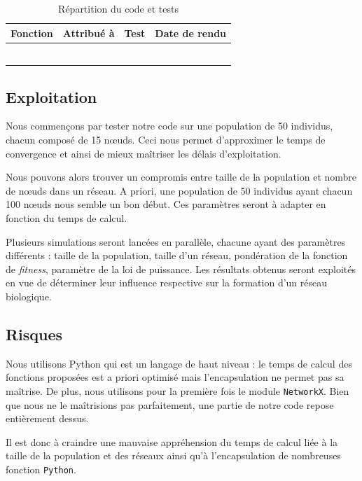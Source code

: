 \begin{center}
\begin{table}
\hspace{-2cm}
\begin{tabular}{|c|c|c|c|}
\hline Fonction & Attribué à & Test & Date de rendu \\
\hline
\hline \\
\hline \\
\hline \\
\hline \\
\hline \\
\hline \\
\end{tabular}
\caption{Répartition du code et tests}
\label{Tab}
\end{table}
\end{center}

\subsection{Exploitation}
Nous commençons par tester notre code sur une population de 50 individus, chacun composé de 15 nœuds. Ceci nous permet d'approximer le temps de convergence et ainsi de mieux ma\^itriser les délais d'exploitation.

Nous pouvons alors trouver un compromis entre taille de la population et nombre de nœuds dans un réseau. A priori, une population de 50 individus ayant chacun 100 nœuds nous semble un bon début. Ces paramètres seront à adapter en fonction du temps de calcul.

Plusieurs simulations seront lancées en parallèle, chacune ayant des paramètres différents : taille de la population, taille d'un réseau, pondération de la fonction de \textit{fitness}, paramètre de la loi de puissance. Les résultats obtenus seront exploités en vue de déterminer leur influence respective sur la formation d'un réseau biologique.

\subsection{Risques}
Nous utilisons Python qui est un langage de haut niveau : le temps de calcul des fonctions proposées est a priori optimisé mais l'encapsulation ne permet pas sa maîtrise. De plus, nous utilisons pour la première fois le module \verb?NetworkX?. Bien que nous ne le ma\^itrisions pas parfaitement, une partie de notre code repose entièrement dessus.

Il est donc à craindre une mauvaise appréhension du temps de calcul liée à la taille de la population et des réseaux ainsi qu'à l'encapsulation de nombreuses fonction \verb?Python?.


